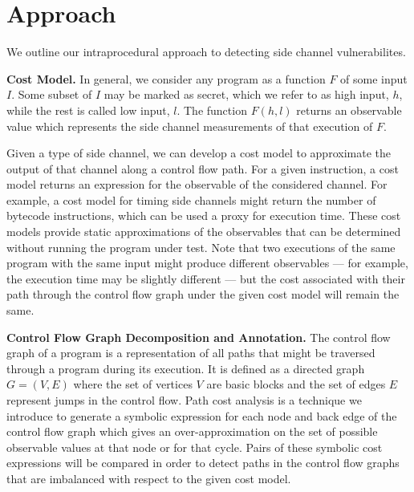 \section{Approach}

We outline our intraprocedural approach to detecting side channel vulnerabilites. 

\textbf{Cost Model.} In general, we consider any program as a function $F$ of some input $I$. Some subset of $I$ may be marked as secret, which we refer to as high input, $h$, while the rest is called low input, $l$. The function $F(h,l)$ returns an observable value which represents the side channel measurements of that execution of $F$. 

Given a type of side channel, we can develop a cost model to approximate the output of that channel along a control flow path. For a given instruction, a cost model returns an expression for the observable of the considered channel. For example, a cost model for timing side channels might return the number of bytecode instructions, which can be used a proxy for execution time. These cost models provide static approximations of the observables that can be determined without running the program under test. Note that two executions of the same program with the same input might produce different observables --- for example, the execution time may be slightly different --- but the cost associated with their path through the control flow graph under the given cost model will remain the same.



\textbf{Control Flow Graph Decomposition and Annotation.} The control flow graph of a program is a representation of all paths that might be traversed through a program during its execution. It is defined as a directed graph $G = (V,E)$ where the set of vertices $V$ are basic blocks and the set of edges $E$ represent jumps in the control flow. Path cost analysis is a technique we introduce to generate a symbolic expression for each node and back edge of the control flow graph which gives an over-approximation on the set of possible observable values at that node or for that cycle. Pairs of these symbolic cost expressions will be compared in order to detect paths in the control flow graphs that are imbalanced with respect to the given cost model. 


